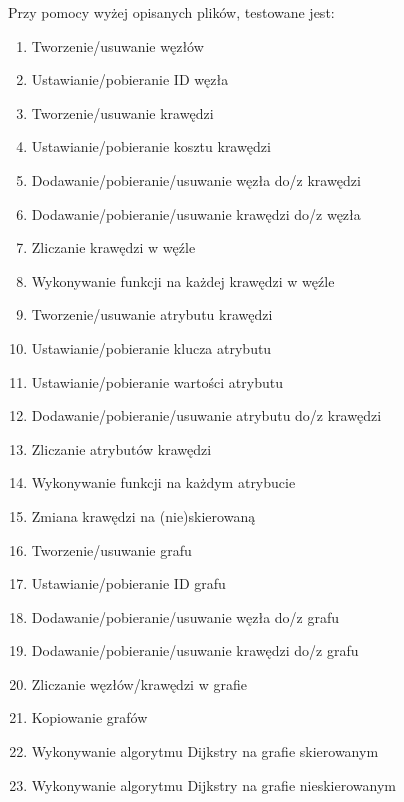 \documentclass[a4paper,12pt,polish,twoside,openright]{thesis}
\begin{document}
Przy pomocy wyżej opisanych plików, testowane jest:
\begin{enumerate}
	\item Tworzenie/usuwanie węzłów
	\item Ustawianie/pobieranie ID węzła
	\item Tworzenie/usuwanie krawędzi
	\item Ustawianie/pobieranie kosztu krawędzi
	\item Dodawanie/pobieranie/usuwanie węzła do/z krawędzi
	\item Dodawanie/pobieranie/usuwanie krawędzi do/z węzła
	\item Zliczanie krawędzi w węźle
	\item Wykonywanie funkcji na każdej krawędzi w węźle
	\item Tworzenie/usuwanie atrybutu krawędzi
	\item Ustawianie/pobieranie klucza atrybutu
	\item Ustawianie/pobieranie wartości atrybutu
	\item Dodawanie/pobieranie/usuwanie atrybutu do/z krawędzi
	\item Zliczanie atrybutów krawędzi
	\item Wykonywanie funkcji na każdym atrybucie
	\item Zmiana krawędzi na (nie)skierowaną
	\item Tworzenie/usuwanie grafu
	\item Ustawianie/pobieranie ID grafu
	\item Dodawanie/pobieranie/usuwanie węzła do/z grafu
	\item Dodawanie/pobieranie/usuwanie krawędzi do/z grafu
	\item Zliczanie węzłów/krawędzi w grafie
	\item Kopiowanie grafów
	\item Wykonywanie algorytmu Dijkstry na grafie skierowanym
	\item Wykonywanie algorytmu Dijkstry na grafie nieskierowanym
\end{enumerate}
\end{document}
